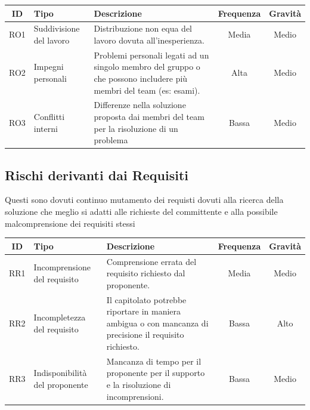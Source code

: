 \documentclass[a4paper, 12pt]{article}
\begin{document}
\begin{center}
	\begin{tabularx}{\textwidth}{||c|X|X|c|c||}
		\hline
		\textbf{ID} & \textbf{Tipo}           & \textbf{Descrizione}                                                                                               & \textbf{Frequenza} & \textbf{Gravità} \\
		\hline \hline
		RO1         & Suddivisione del lavoro & Distribuzione non equa del lavoro dovuta all'inesperienza.                                                         & Media              & Medio            \\
		\hline
		RO2         & Impegni personali       & Problemi personali legati ad un singolo membro del gruppo o che possono includere più membri del team (es: esami). & Alta               & Medio            \\
		\hline
		RO3         & Conflitti interni       & Differenze nella soluzione proposta dai membri del team per la risoluzione di un problema                          & Bassa              & Medio            \\
		\hline \hline
	\end{tabularx}
\end{center}



\subsection{Rischi derivanti dai Requisiti}
Questi sono dovuti continuo mutamento dei requisti dovuti alla ricerca della soluzione che meglio si adatti alle richieste del committente e alla possibile malcomprensione dei requisiti stessi

\begin{center}
	\begin{tabularx}{\textwidth}{||c|X|X|c|c||}
		\hline
		\textbf{ID} & \textbf{Tipo}                  & \textbf{Descrizione}                                                                                     & \textbf{Frequenza} & \textbf{Gravità} \\
		\hline \hline
		RR1         & Incomprensione del requisito   & Comprensione errata del requisito richiesto dal proponente.                                              & Media              & Medio            \\
		\hline
		RR2         & Incompletezza del requisito    & Il capitolato potrebbe riportare in maniera ambigua o con mancanza di precisione il requisito richiesto. & Bassa              & Alto             \\
		\hline
		RR3         & Indisponibilità del proponente & Mancanza di tempo per il proponente per il supporto e la risoluzione di incomprensioni.                  & Bassa              & Medio            \\
		\hline \hline
	\end{tabularx}
\end{center}
\end{document}
